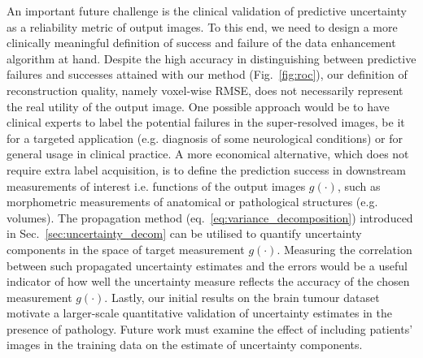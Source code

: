 An important future challenge is the clinical validation of predictive uncertainty as a reliability metric of output images. To this end, we need to design a more clinically meaningful definition of success and failure of the data enhancement algorithm at hand. Despite the high accuracy in distinguishing between predictive failures and successes attained with our method (Fig.~\ref{fig:roc}),  our definition of reconstruction quality, namely voxel-wise RMSE, does not necessarily represent the real utility of the output image. One possible approach would be to have clinical experts to label the potential failures in the super-resolved images, be it for a targeted application (e.g. diagnosis of some neurological conditions) or for general usage in clinical practice. A more economical alternative, which does not require extra label acquisition, is to define the prediction success in downstream measurements of interest i.e. functions of the output images $g(\cdot)$, such as morphometric measurements of anatomical or pathological structures (e.g. volumes). The propagation method (eq.~\eqref{eq:variance_decomposition}) introduced in Sec.~\ref{sec:uncertainty_decom} can be utilised to quantify uncertainty components in the space of target measurement  $g(\cdot)$. Measuring the correlation between such propagated uncertainty estimates and the errors would be a useful indicator of how well the uncertainty measure reflects the accuracy of the chosen measurement $g(\cdot)$. Lastly, our initial results on the brain tumour dataset motivate a larger-scale quantitative validation of uncertainty estimates in the presence of pathology. Future work must examine the effect of including patients' images in the training data on the estimate of uncertainty components. 

